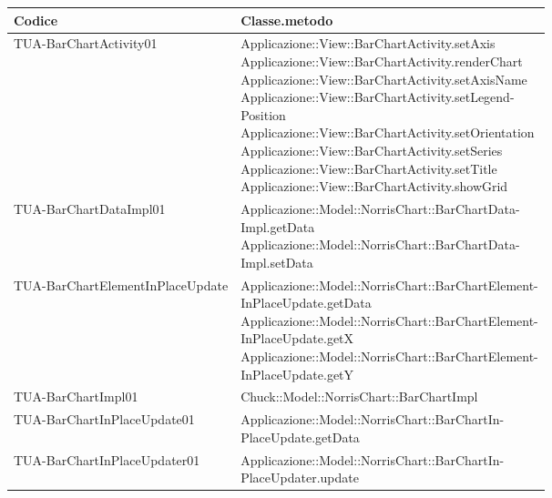\begin{longtabu} spread 1cm [c]{|p{6cm}|p{8cm}|}
\hline
\rowfont{\bf \centering}
Codice &
Classe.metodo \\

\hline
\endhead

TUA-BarChartActivity01 & \parbox[t]{4cm}{
 Applicazione::View::BarChartActivity.setAxis \\
Applicazione::View::BarChartActivity.renderChart \\
Applicazione::View::BarChartActivity.setAxisName \\
Applicazione::View::BarChartActivity.setLegend-\\Position \\
Applicazione::View::BarChartActivity.setOrientation \\
Applicazione::View::BarChartActivity.setSeries \\
Applicazione::View::BarChartActivity.setTitle \\
Applicazione::View::BarChartActivity.showGrid }\\

\hline
TUA-BarChartDataImpl01 & \parbox[t]{4cm}{
 Applicazione::Model::NorrisChart::BarChartData-\\Impl.getData \\
Applicazione::Model::NorrisChart::BarChartData-\\Impl.setData }\\

\hline
TUA-BarChartElementInPlaceUpdate & \parbox[t]{4cm}{
 Applicazione::Model::NorrisChart::BarChartElement-\\InPlaceUpdate.getData \\
Applicazione::Model::NorrisChart::BarChartElement-\\InPlaceUpdate.getX \\
Applicazione::Model::NorrisChart::BarChartElement-\\InPlaceUpdate.getY }\\

\hline
TUA-BarChartImpl01 & \parbox[t]{4cm}{
 Chuck::Model::NorrisChart::BarChartImpl }\\

\hline
TUA-BarChartInPlaceUpdate01 & \parbox[t]{4cm}{
 Applicazione::Model::NorrisChart::BarChartIn-\\PlaceUpdate.getData }\\

\hline
TUA-BarChartInPlaceUpdater01 & \parbox[t]{4cm}{
 Applicazione::Model::NorrisChart::BarChartIn-\\PlaceUpdater.update }\\


\end{longtabu}
